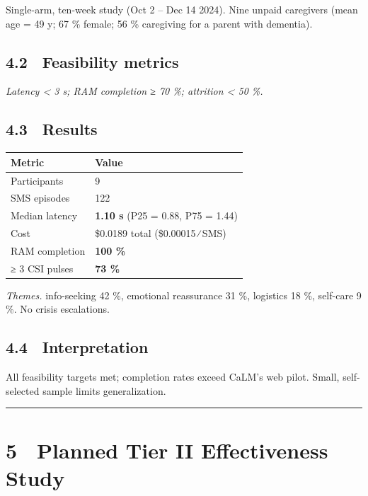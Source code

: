Single-arm, ten-week study (Oct 2 -- Dec 14 2024). Nine unpaid
caregivers (mean age = 49 y; 67 \% female; 56 \% caregiving for a parent
with dementia).

\subsection{4.2 Feasibility metrics}\label{feasibility-metrics}

\emph{Latency \textless{} 3 s; RAM completion ≥ 70 \%; attrition
\textless{} 50 \%.}

\subsection{4.3 Results}\label{results}

\begin{longtable}[]{@{}ll@{}}
\toprule\noalign{}
Metric & Value \\
\midrule\noalign{}
\endhead
\bottomrule\noalign{}
\endlastfoot
Participants & 9 \\
SMS episodes & 122 \\
Median latency & \textbf{1.10 s} (P25 = 0.88, P75 = 1.44) \\
Cost & \$0.0189 total (\$0.00015 ∕ SMS) \\
RAM completion & \textbf{100 \%} \\
≥ 3 CSI pulses & \textbf{73 \%} \\
\end{longtable}

\emph{Themes.} info-seeking 42 \%, emotional reassurance 31 \%,
logistics 18 \%, self-care 9 \%. No crisis escalations.

\subsection{4.4 Interpretation}\label{interpretation}

All feasibility targets met; completion rates exceed CaLM's web pilot.
Small, self-selected sample limits generalization.

\begin{center}\rule{0.5\linewidth}{0.5pt}\end{center}

\section{5 Planned Tier II Effectiveness
Study}\label{planned-tier-ii-effectiveness-study}

